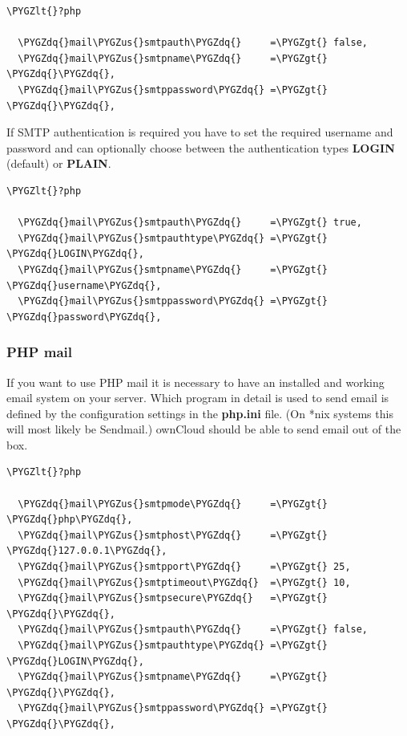 \documentclass[letterpaper,10pt,english]{sphinxmanual}
\def\PYGZus{\char`\_}
\def\PYGZlt{\char`\<}
\def\PYGZgt{\char`\>}
\def\PYGZdq{\char`\"}
\begin{document}
\begin{Verbatim}[commandchars=\\\{\}]
\PYGZlt{}?php

  \PYGZdq{}mail\PYGZus{}smtpauth\PYGZdq{}     =\PYGZgt{} false,
  \PYGZdq{}mail\PYGZus{}smtpname\PYGZdq{}     =\PYGZgt{} \PYGZdq{}\PYGZdq{},
  \PYGZdq{}mail\PYGZus{}smtppassword\PYGZdq{} =\PYGZgt{} \PYGZdq{}\PYGZdq{},
\end{Verbatim}

If SMTP authentication is required you have to set the required username
and password and can optionally choose between the authentication types
\textbf{LOGIN} (default) or \textbf{PLAIN}.

\begin{Verbatim}[commandchars=\\\{\}]
\PYGZlt{}?php

  \PYGZdq{}mail\PYGZus{}smtpauth\PYGZdq{}     =\PYGZgt{} true,
  \PYGZdq{}mail\PYGZus{}smtpauthtype\PYGZdq{} =\PYGZgt{} \PYGZdq{}LOGIN\PYGZdq{},
  \PYGZdq{}mail\PYGZus{}smtpname\PYGZdq{}     =\PYGZgt{} \PYGZdq{}username\PYGZdq{},
  \PYGZdq{}mail\PYGZus{}smtppassword\PYGZdq{} =\PYGZgt{} \PYGZdq{}password\PYGZdq{},
\end{Verbatim}


\subsubsection{PHP mail}
\label{configuration_server/email_configuration:php-mail}
If you want to use PHP mail it is necessary to have an installed and working
email system on your server. Which program in detail is used to send email is
defined by the configuration settings in the \textbf{php.ini} file. (On *nix
systems this will most likely be Sendmail.) ownCloud should be able to send
email out of the box.

\begin{Verbatim}[commandchars=\\\{\}]
\PYGZlt{}?php

  \PYGZdq{}mail\PYGZus{}smtpmode\PYGZdq{}     =\PYGZgt{} \PYGZdq{}php\PYGZdq{},
  \PYGZdq{}mail\PYGZus{}smtphost\PYGZdq{}     =\PYGZgt{} \PYGZdq{}127.0.0.1\PYGZdq{},
  \PYGZdq{}mail\PYGZus{}smtpport\PYGZdq{}     =\PYGZgt{} 25,
  \PYGZdq{}mail\PYGZus{}smtptimeout\PYGZdq{}  =\PYGZgt{} 10,
  \PYGZdq{}mail\PYGZus{}smtpsecure\PYGZdq{}   =\PYGZgt{} \PYGZdq{}\PYGZdq{},
  \PYGZdq{}mail\PYGZus{}smtpauth\PYGZdq{}     =\PYGZgt{} false,
  \PYGZdq{}mail\PYGZus{}smtpauthtype\PYGZdq{} =\PYGZgt{} \PYGZdq{}LOGIN\PYGZdq{},
  \PYGZdq{}mail\PYGZus{}smtpname\PYGZdq{}     =\PYGZgt{} \PYGZdq{}\PYGZdq{},
  \PYGZdq{}mail\PYGZus{}smtppassword\PYGZdq{} =\PYGZgt{} \PYGZdq{}\PYGZdq{},
\end{Verbatim}
\end{document}
